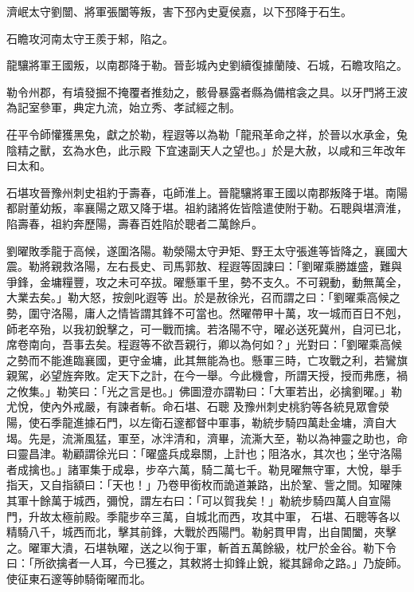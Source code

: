 \begin{pinyinscope}
 濟岷太守劉闓、將軍張闔等叛，害下邳內史夏侯嘉，以下邳降于石生。



 石瞻攻河南太守王羨于邾，陷之。



 龍驤將軍王國叛，以南郡降于勒。晉彭城內史劉續復據蘭陵、石城，石瞻攻陷之。



 勒令州郡，有墳發掘不掩覆者推劾之，骸骨暴露者縣為備棺衾之具。以牙門將王波為記室參軍，典定九流，始立秀、孝試經之制。



 茌平令師懽獲黑兔，獻之於勒，程遐等以為勒「龍飛革命之祥，於晉以水承金，兔陰精之獸，玄為水色，此示殿
 下宜速副天人之望也。」於是大赦，以咸和三年改年曰太和。



 石堪攻晉豫州刺史祖約于壽春，屯師淮上。晉龍驤將軍王國以南郡叛降于堪。南陽都尉董幼叛，率襄陽之眾又降于堪。祖約諸將佐皆陰遣使附于勒。石聰與堪濟淮，陷壽春，祖約奔歷陽，壽春百姓陷於聰者二萬餘戶。



 劉曜敗季龍于高候，遂圍洛陽。勒滎陽太守尹矩、野王太守張進等皆降之，襄國大震。勒將親救洛陽，左右長史、司馬郭敖、程遐等固諫曰：「劉曜乘勝雄盛，難與爭鋒，金墉糧豐，攻之未可卒拔。曜懸軍千里，勢不支久。不可親動，動無萬全，大業去矣。」勒大怒，按劍叱遐等
 出。於是赦徐光，召而謂之曰：「劉曜乘高候之勢，圍守洛陽，庸人之情皆謂其鋒不可當也。然曜帶甲十萬，攻一城而百日不剋，師老卒殆，以我初銳擊之，可一戰而擒。若洛陽不守，曜必送死冀州，自河已北，席卷南向，吾事去矣。程遐等不欲吾親行，卿以為何如？」光對曰：「劉曜乘高候之勢而不能進臨襄國，更守金墉，此其無能為也。懸軍三時，亡攻戰之利，若鸞旗親駕，必望旌奔敗。定天下之計，在今一舉。今此機會，所謂天授，授而弗應，禍之攸集。」勒笑曰：「光之言是也。」佛圖澄亦謂勒曰：「大軍若出，必擒劉曜。」勒尤悅，使內外戒嚴，有諫者斬。命石堪、石聰
 及豫州刺史桃豹等各統見眾會滎陽，使石季龍進據石門，以左衛石邃都督中軍事，勒統步騎四萬赴金墉，濟自大堨。先是，流澌風猛，軍至，冰泮清和，濟畢，流澌大至，勒以為神靈之助也，命曰靈昌津。勒顧謂徐光曰：「曜盛兵成皋關，上計也；阻洛水，其次也；坐守洛陽者成擒也。」諸軍集于成皋，步卒六萬，騎二萬七千。勒見曜無守軍，大悅，舉手指天，又自指額曰：「天也！」乃卷甲銜枚而詭道兼路，出於鞏、訾之間。知曜陳其軍十餘萬于城西，彌悅，謂左右曰：「可以賀我矣！」勒統步騎四萬人自宣陽門，升故太極前殿。季龍步卒三萬，自城北而西，攻其中軍，
 石堪、石聰等各以精騎八千，城西而北，擊其前鋒，大戰於西陽門。勒躬貫甲胄，出自閶闔，夾擊之。曜軍大潰，石堪執曜，送之以徇于軍，斬首五萬餘級，枕尸於金谷。勒下令曰：「所欲擒者一人耳，今已獲之，其敕將士抑鋒止銳，縱其歸命之路。」乃旋師。使征東石邃等帥騎衛曜而北。




\end{pinyinscope}
